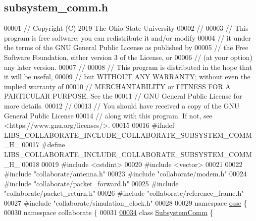 \hypertarget{subsystem__comm_8h_source}{}\subsection{subsystem\+\_\+comm.\+h}
\label{subsystem__comm_8h_source}

\begin{DoxyCode}
00001 \textcolor{comment}{// Copyright (C) 2019 The Ohio State University}
00002 \textcolor{comment}{//}
00003 \textcolor{comment}{// This program is free software: you can redistribute it and/or modify}
00004 \textcolor{comment}{// it under the terms of the GNU General Public License as published by}
00005 \textcolor{comment}{// the Free Software Foundation, either version 3 of the License, or}
00006 \textcolor{comment}{// (at your option) any later version.}
00007 \textcolor{comment}{//}
00008 \textcolor{comment}{// This program is distributed in the hope that it will be useful,}
00009 \textcolor{comment}{// but WITHOUT ANY WARRANTY; without even the implied warranty of}
00010 \textcolor{comment}{// MERCHANTABILITY or FITNESS FOR A PARTICULAR PURPOSE.  See the}
00011 \textcolor{comment}{// GNU General Public License for more details.}
00012 \textcolor{comment}{//}
00013 \textcolor{comment}{// You should have received a copy of the GNU General Public License}
00014 \textcolor{comment}{// along with this program.  If not, see <https://www.gnu.org/licenses/>.}
00015 
00016 \textcolor{preprocessor}{#ifndef LIBS\_COLLABORATE\_INCLUDE\_COLLABORATE\_SUBSYSTEM\_COMM\_H\_}
00017 \textcolor{preprocessor}{#define LIBS\_COLLABORATE\_INCLUDE\_COLLABORATE\_SUBSYSTEM\_COMM\_H\_}
00018 
00019 \textcolor{preprocessor}{#include <cstdint>}
00020 \textcolor{preprocessor}{#include <vector>}
00021 
00022 \textcolor{preprocessor}{#include "collaborate/antenna.h"}
00023 \textcolor{preprocessor}{#include "collaborate/modem.h"}
00024 \textcolor{preprocessor}{#include "collaborate/packet\_forward.h"}
00025 \textcolor{preprocessor}{#include "collaborate/packet\_return.h"}
00026 \textcolor{preprocessor}{#include "collaborate/reference\_frame.h"}
00027 \textcolor{preprocessor}{#include "collaborate/simulation\_clock.h"}
00028 
00029 \textcolor{keyword}{namespace }\hyperlink{namespaceosse}{osse} \{
00030 \textcolor{keyword}{namespace }collaborate \{
00031 
\hyperlink{classosse_1_1collaborate_1_1_subsystem_comm}{00034} \textcolor{keyword}{class }\hyperlink{classosse_1_1collaborate_1_1_subsystem_comm}{SubsystemComm} \{

\end{DoxyCode}
